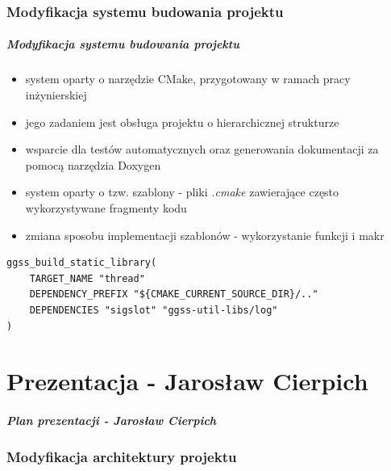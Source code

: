 \documentclass[10pt]{beamer}
\begin{document}
\section{Modyfikacja systemu budowania projektu}

\begin{frame}[fragile]
\frametitle{Modyfikacja systemu budowania projektu}
\begin{itemize}
    \item system oparty o narzędzie CMake, przygotowany w ramach pracy inżynierskiej
    \item jego zadaniem jest obsługa projektu o hierarchicznej strukturze
    \item wsparcie dla testów automatycznych oraz generowania dokumentacji za pomocą narzędzia Doxygen
    \item system oparty o tzw. szablony - pliki \emph{.cmake} zawierające często wykorzystywane fragmenty kodu
    \item zmiana sposobu implementacji szablonów - wykorzystanie funkcji i makr
\end{itemize}
\begin{lstlisting}[caption={}]
ggss_build_static_library(
    TARGET_NAME "thread"
    DEPENDENCY_PREFIX "${CMAKE_CURRENT_SOURCE_DIR}/.."
    DEPENDENCIES "sigslot" "ggss-util-libs/log"
)
\end{lstlisting}
\end{frame}


\part{Prezentacja - Jarosław Cierpich}

\begin{frame}
\frametitle{Plan prezentacji - Jarosław Cierpich}
\tableofcontents
\end{frame}

\section{Modyfikacja architektury projektu}
\end{document}
